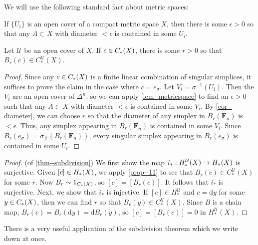 \documentclass[a4paper,11pt]{article}
\begin{document}
				We will use the following standard fact about metric spaces:

				\begin{lemma}\label{lem--metricspace}
					If $\{U_i\}$ is an open cover of a compact metric space $X$, then there is some $\epsilon>0$ so that any $A\subset X$ with diameter $<\epsilon$ is contained in some $U_i$.
				\end{lemma}
				
				\begin{prop}\label{prop--11}
					Let $\mathcal{U}$ be an open cover of $X$. If $c\in C_{\ast}(X)$, there is some $r>0$ so that $B_r(c)\in C_\ast^{\mathcal{U}}(X)$.
				\end{prop}
				\begin{proof}
					Since any $c\in C_{\ast}(X)$ is a finite linear combination of singular simplices, it suffices to prove the claim in the case where $c=e_\sigma$. Let $V_i=\sigma^{-1}(U_i)$. Then the $V_i$ are an open cover of $\Delta^n$, so we can apply \autoref{lem--metricspace} to find an $\epsilon>0$ such that any $A\subset X$ with diameter $<\epsilon$ is contained in some $V_i$. By \autoref{cor--diameter}, we can choose $r$ so that the diameter of any simplex in $B_r(\textbf{F}_n)$ is $<\epsilon$. Thus, any simplex appearing in $B_r(\textbf{F}_n)$ is contained in some $V_i$. Since $B_r(e_\sigma)=\sigma_{\#}(B_r(\textbf{F}_n))$, every singular simplex appearing in $B_r(e_\sigma)$ is contained in some $U_i$.
				\end{proof}

				\begin{proof}(of \autoref{thm--subdivision})
					We first show the map $i_\ast:H_\ast^\mathcal{U}(X)\rightarrow H_{\ast}(X)$ is surjective. Given $[c]\in H_{\ast}(X)$, we apply \autoref{prop--11} to see that $B_r(c)\in C_\ast^\mathcal{U}(X)$ for some $r$. Now $B_r\sim 1_{C_{\ast}(X)}$, so $[c]=[B_r(c)]$. It follows that $i_\ast$ is surjective. Next, we show that $i_\ast$ is injective. If $[c]\in H_\ast^\mathcal{U}$ and $c=\mathrm{d}y$ for some $y\in C_{\ast}(X)$, then we can find $r$ so that $B_r(y)\in C_\ast^\mathcal{U}(X)$. Since $B$ is a chain map, $B_r(c)=B_r(\mathrm{d}y)=\mathrm{d}B_r(y)$, so $[c]=[B_r(c)]=0$ in $H_\ast^\mathcal{U}(X)$.
				\end{proof}

				There is a very useful application of the subdivision theorem which we write down at once.
\end{document}

